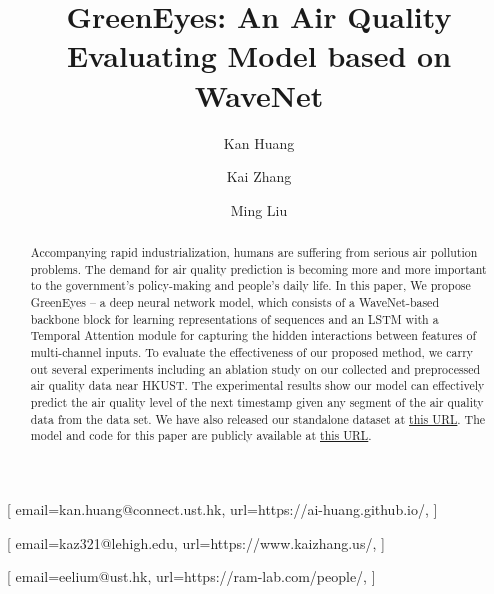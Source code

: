 \documentclass[
twocolumn,
]{ceurart}
\begin{document}


\title{GreenEyes: An Air Quality Evaluating Model based on WaveNet}


\author[1]{Kan Huang}[%
email=kan.huang@connect.ust.hk,
url=https://ai-huang.github.io/,
]
\cormark[1]
\address[1]{The Hong Kong University of Science and Technology, Clearwater Bay, Hong Kong, China}

\author[2]{Kai Zhang}[%
email=kaz321@lehigh.edu,
url=https://www.kaizhang.us/,
]
\address[2]{Lehigh University, 27 Memorial Dr W, Bethlehem, PA, United States}

\author[3]{Ming Liu}[%
email=eelium@ust.hk,
url=https://ram-lab.com/people/,
]
\address[3]{The Hong Kong University of Science and Technology, Clearwater Bay, Hong Kong, China}


\begin{abstract}
  Accompanying rapid industrialization, humans are suffering from serious air pollution problems. The demand for air quality prediction is becoming more and more important to the government's policy-making and people's daily life. In this paper, We propose GreenEyes -- a deep neural network model, which consists of a WaveNet-based backbone block for learning representations of sequences and an LSTM with a Temporal Attention module for capturing the hidden interactions between features of multi-channel inputs. To evaluate the effectiveness of our proposed method, we carry out several experiments including an ablation study on our collected and preprocessed air quality data near HKUST. The experimental results show our model can effectively predict the air quality level of the next timestamp given any segment of the air quality data from the data set. We have also released our standalone dataset at \href{https://github.com/AI-Huang/IAQI_Dataset}{this URL}. The model and code for this paper are publicly available at \href{https://github.com/AI-Huang/AirEvaluation}{this URL}.
\end{abstract}
\end{document}
